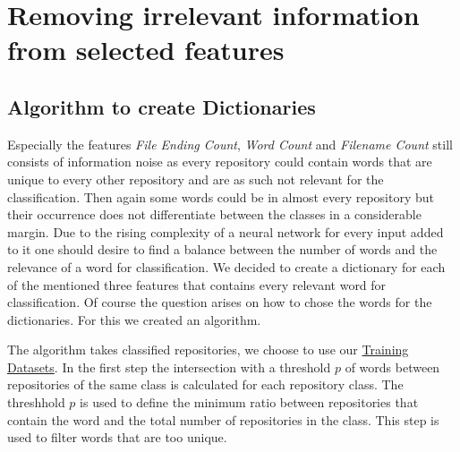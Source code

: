 \documentclass[paper=A4,pagesize=auto,12pt,headinclude=true,footinclude=true,BCOR=0mm,DIV=calc]{scrartcl}
\begin{document}
	
	
	\section{Removing irrelevant information from selected features}
	\label{sec: dictionary}
	\subsection{Algorithm to create Dictionaries}
	Especially the features \textit{File Ending Count}, \textit{Word Count} and\textit{ Filename Count} still consists of information noise as every repository could contain words that are unique to every other repository and are as such not relevant for the classification. Then again some words could be in almost every repository but their occurrence does not differentiate between the classes in a considerable margin. Due to the rising complexity of a neural network for every input added to it one should desire to find a balance between the number of words and the relevance of a word for classification. We decided to create a dictionary for each of the mentioned three features that contains every relevant word for classification.
	Of course the question arises on how to chose the words for the dictionaries. For this we created an algorithm.
		
	The algorithm takes classified repositories, we choose to use our \hyperref[src:Repositories]{Training Datasets}.
	In the first step the intersection with a threshold $p$ of words between repositories of the same class is calculated for each repository class. The threshhold $p$ is used to define the minimum ratio between repositories that contain the word and the total number of repositories in the class. 
	This step is used to filter words that are too unique.
	
\end{document}
